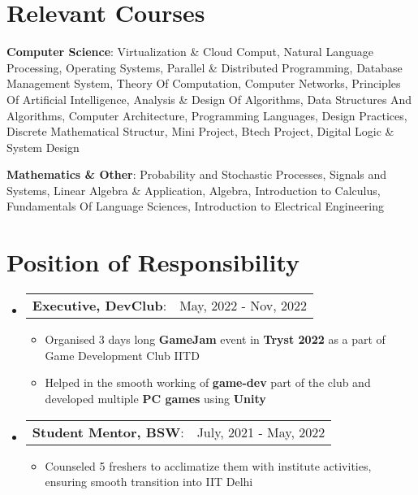 \documentclass[letterpaper,11pt]{article}
\makeatletter
\newcommand{\resumeItem}[1]{
  \item\small{
    {#1 \vspace{-2pt}}
  }
}
\newcommand{\headingStart}{
  \begin{tabular*}{0.97\textwidth}[t]{l@{\extracolsep{\fill}}r}
}
\newcommand{\porHeading}[3]{
  \vspace{-2pt}\item
    \headingStart
      \textbf{#1, #2}: & #3 \\
    \end{tabular*}\vspace{-7pt}
}
\newcommand{\listStart}[2]
  {\begin{itemize}[leftmargin=#1in, rightmargin=0in, label={#2}]}
\newcommand{\listEnd}{\end{itemize}}
\newcommand{\itemListStart}[1]
  {\begin{itemize}[leftmargin=#1in, rightmargin=0in]}
\newcommand{\itemListEnd}{\end{itemize}\vspace{-5pt}}
\makeatother
\begin{document}
%
\section{Relevant Courses}
  \itemListStart{0.2}
  \small{\item{
  \textbf{Computer Science}{: Virtualization \& Cloud Comput, Natural Language Processing, Operating Systems, 
    Parallel \& Distributed Programming, Database Management System, Theory Of Computation, Computer Networks, Principles Of Artificial Intelligence,
    Analysis \& Design Of Algorithms, Data Structures And Algorithms, Computer Architecture, Programming Languages, Design Practices, Discrete Mathematical Structur, 
    Mini Project, Btech Project, Digital Logic \& System Design}
  }}
  \small{\item{
    \textbf{Mathematics \& Other}{: Probability and Stochastic Processes, Signals and Systems,
    Linear Algebra \& Application, Algebra, Introduction to Calculus, Fundamentals Of Language Sciences, Introduction to Electrical Engineering }
  }}
  \listEnd


% 

\section{Position of Responsibility}
\listStart{0.05}{}

\porHeading
  {Executive}
  {DevClub}
  {May, 2022 - Nov, 2022}
  \itemListStart{0.2}
    \resumeItem{Organised 3 days long \textbf{GameJam} event in \textbf{Tryst 2022} as a part of Game Development Club IITD}
    \resumeItem{Helped in the smooth working of \textbf{game-dev} part of the club and developed multiple \textbf{PC games} using \textbf{Unity}}
  \itemListEnd

\porHeading
  {Student Mentor}
  {BSW}
  {July, 2021 - May, 2022}
  \itemListStart{0.2}
    \resumeItem{Counseled 5 freshers to acclimatize them with institute activities, ensuring smooth transition into IIT Delhi}
  \itemListEnd
\listEnd


\end{document}
